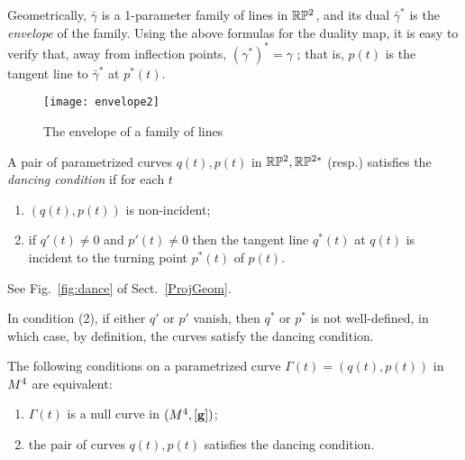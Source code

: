 Geometrically, $\bar \gamma$ is a 1-parameter
 family of lines  in $\mathbb{R}\mathbb{P}^2$, and its dual $\bar \gamma^*$ is the {\em envelope} of the family. Using the above formulas 
 for the duality map,  it is easy to verify that, away from inflection points, $(\gamma^*)^*=\gamma$ ; that is, $p(t)$ is the tangent line to $\bar \gamma^*$ at $p^*(t)$. 
 

\begin{figure}[h!]\centering
\texttt{[image: envelope2]}
\caption{The envelope  of a family  of lines}
\end{figure}



 


\begin{definition}\label{def_danc} A pair of  parametrized curves $q(t), p(t)$ in $ \mathbb{R}\mathbb{P}^2,  \mathbb{R}\mathbb{P}^{2*}$ (resp.) satisfies the {\em  dancing condition}  if for each $t$ 

\begin{enumerate}
\item $(q(t), p(t))$ is non-incident;  

\item  if $q'(t)\neq 0$ and $p'(t)\neq 0$ then the tangent line $q^*(t)$ at $q(t)$  is incident to the turning point $p^*(t)$ of $p(t)$.

 \end{enumerate}

\end{definition}
See Fig.~\ref{fig:dance} of Sect.~\ref{ProjGeom}. 

\begin{rmrk} In condition (2), if either $q'$ or $p'$ vanish, then $q^*$ or $p^*$ is not well-defined, in which case, by definition, the curves satisfy the dancing condition. 
 \end{rmrk}



\begin{proposition}\label{prop_danc} The following conditions on a parametrized curve $\Gamma(t)=(q(t), p(t))$ in $M^4$ are equivalent:

\begin{enumerate}
\item  $\Gamma(t)$ is a null curve in $(M^4,[\mathbf{ g}])$;

\item  the pair of curves $q(t), p(t)$ satisfies the dancing condition.
\end{enumerate}
\end{proposition}

